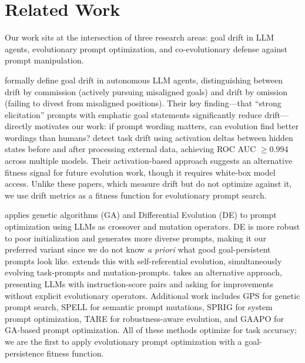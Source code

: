 \section{Related Work}
\label{sec:related}

Our work sits at the intersection of three research areas: goal drift in LLM agents, evolutionary prompt optimization, and co-evolutionary defense against prompt manipulation.

\citet{arike2025goaldrift} formally define goal drift in autonomous LLM agents, distinguishing between drift by commission (actively pursuing misaligned goals) and drift by omission (failing to divest from misaligned positions).
Their key finding---that ``strong elicitation'' prompts with emphatic goal statements significantly reduce drift---directly motivates our work: if prompt wording matters, can evolution find better wordings than humans?
\citet{abdelnabi2024tasktracker} detect task drift using activation deltas between hidden states before and after processing external data, achieving ROC AUC $\geq$0.994 across multiple models.
Their activation-based approach suggests an alternative fitness signal for future evolution work, though it requires white-box model access.
Unlike these papers, which measure drift but do not optimize against it, we use drift metrics as a fitness function for evolutionary prompt search.

\evoprompt \citep{guo2024evoprompt} applies genetic algorithms (GA) and Differential Evolution (DE) to prompt optimization using LLMs as crossover and mutation operators.
DE is more robust to poor initialization and generates more diverse prompts, making it our preferred variant since we do not know \emph{a priori} what good goal-persistent prompts look like.
\promptbreeder \citep{fernando2024promptbreeder} extends this with self-referential evolution, simultaneously evolving task-prompts and mutation-prompts.
\opro \citep{yang2023opro} takes an alternative approach, presenting LLMs with instruction-score pairs and asking for improvements without explicit evolutionary operators.
Additional work includes \textsc{GPS} \citep{xu2022gps} for genetic prompt search, \textsc{SPELL} \citep{gao2023spell} for semantic prompt mutations, \textsc{SPRIG} \citep{srinivasan2024sprig} for system prompt optimization, \textsc{TARE} \citep{tare2025} for robustness-aware evolution, and \textsc{GAAPO} \citep{gaapo2025} for GA-based prompt optimization.
All of these methods optimize for task accuracy; we are the first to apply evolutionary prompt optimization with a goal-persistence fitness function.


